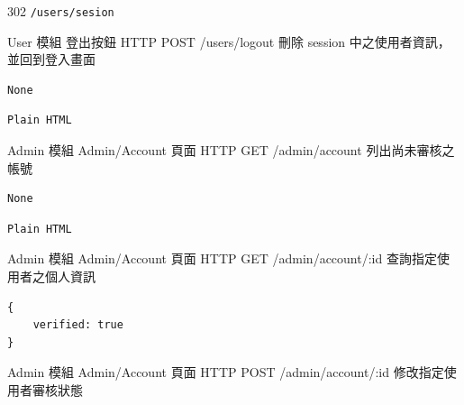 \documentclass{article}
\begin{document}
\begin{lrbox}{\jsonoutputbox}
	302 \texttt{/users/sesion}
\end{lrbox}

{User 模組}
{登出按鈕}
{HTTP POST}
{/users/logout}
{刪除 session 中之使用者資訊，並回到登入畫面}

\bigskip

\begin{lrbox}{\jsoninputbox}
	\begin{lstlisting}
None
\end{lstlisting}
\end{lrbox}

\begin{lrbox}{\jsonoutputbox}
	\begin{lstlisting}
Plain HTML
\end{lstlisting}
\end{lrbox}

{Admin 模組}
{Admin/Account 頁面}
{HTTP GET}
{/admin/account}
{列出尚未審核之帳號}

\bigskip

\begin{lrbox}{\jsoninputbox}
	\begin{lstlisting}
None
\end{lstlisting}
\end{lrbox}

\begin{lrbox}{\jsonoutputbox}
	\begin{lstlisting}
Plain HTML
\end{lstlisting}
\end{lrbox}

{Admin 模組}
{Admin/Account 頁面}
{HTTP GET}
{/admin/account/:id}
{查詢指定使用者之個人資訊}

\bigskip

\begin{lrbox}{\jsoninputbox}
	\begin{lstlisting}
{
	verified: true
}
\end{lstlisting}
\end{lrbox}

\begin{lrbox}{\jsonoutputbox}
\end{lrbox}

{Admin 模組}
{Admin/Account 頁面}
{HTTP POST}
{/admin/account/:id}
{修改指定使用者審核狀態}
\end{document}
